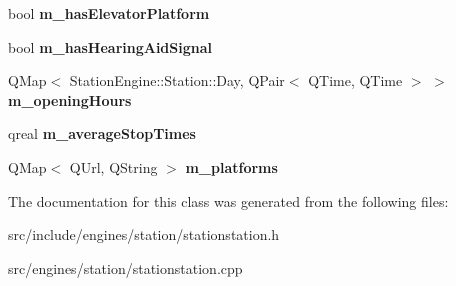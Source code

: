 \begin{DoxyCompactItemize}
bool {\bfseries m\+\_\+has\+Elevator\+Platform}
\item 
\mbox{\label{classStationEngine_1_1Station_a15ea22b7205742dcb196e6b49922dc76}} 
bool {\bfseries m\+\_\+has\+Hearing\+Aid\+Signal}
\item 
\mbox{\label{classStationEngine_1_1Station_ada389e0f4c4648dfe96c9dcf3c46450c}} 
Q\+Map$<$ Station\+Engine\+::\+Station\+::\+Day, Q\+Pair$<$ Q\+Time, Q\+Time $>$ $>$ {\bfseries m\+\_\+opening\+Hours}
\item 
\mbox{\label{classStationEngine_1_1Station_ad6549063a2dd4ce545a84b78a27be74c}} 
qreal {\bfseries m\+\_\+average\+Stop\+Times}
\item 
\mbox{\label{classStationEngine_1_1Station_a78e76176b7fed426f1a131c05541a521}} 
Q\+Map$<$ Q\+Url, Q\+String $>$ {\bfseries m\+\_\+platforms}
\end{DoxyCompactItemize}


The documentation for this class was generated from the following files\+:\begin{DoxyCompactItemize}
\item 
src/include/engines/station/stationstation.\+h\item 
src/engines/station/stationstation.\+cpp\end{DoxyCompactItemize}
